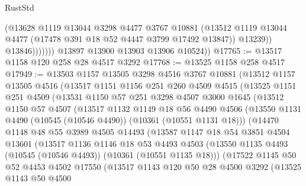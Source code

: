 \begin{lexlean}{RustStd}
\begin{coremodule}
                        (@13628
                          @1119
                          @13044
                          @3298
                          @4477
                          @3767
                          @10881
                          (@13512
                            @1119
                            @13044
                            @4477
                            (@17478 @391 @18 @52 @4447 @3799 @17492 @13847))
                          @13239))
                      @13846)))))))
        @13897
        @13900
        @13903
        @13906
        @10524))
@17765 := @13517 @1158 @120 @258 @28 @4517 @3292
@17768 := @13525 @1158 @258 @4517
@17949 := @13503
    @1157
    @13505
    @3298
    @4516
    @3767
    @10881
    (@13512
      @1157
      @13505
      @4516
      (@13517
        @1151
        @1156
        @251
        @260
        @4509
        @4515
        (@13525
          @1151
          @251
          @4509
          (@13531
            @1150
            @57
            @251
            @3298
            @4507
            @3000
            @1645
            (@13512
              @1150
              @57
              @4507
              (@13517
                @1132
                @1149
                @18
                @56
                @4490
                @4506
                (@13550 @1131 @4490 (@10545 (@10546 @4490)) (@10361 (@10551 @1131 @18)))
                (@14470
                  @1148
                  @48
                  @55
                  @3989
                  @4505
                  @14493
                  (@13587
                    @1147
                    @18
                    @54
                    @3851
                    @4504
                    @13601
                    (@13517
                      @1136
                      @1146
                      @18
                      @53
                      @4493
                      @4503
                      (@13550 @1135 @4493 (@10545 (@10546 @4493)) (@10361 (@10551 @1135 @18)))
                      (@17522
                        @1145
                        @50
                        @52
                        @4453
                        @4502
                        @17550
                        (@13517
                          @1143
                          @120
                          @50
                          @28
                          @4500
                          @3292
                          (@13525
                            @1143
                            @50
                            @4500

\end{coremodule}
\end{lexlean}
